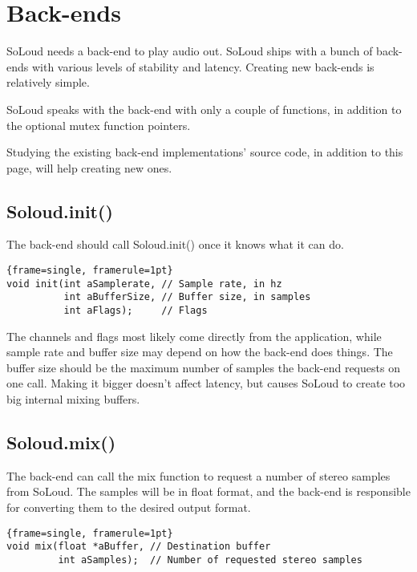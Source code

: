 
\chapter{Back-ends}

SoLoud needs a back-end to play audio out. SoLoud ships with a bunch of back-ends with various levels of stability and latency. Creating new back-ends is relatively simple.

SoLoud speaks with the back-end with only a couple of functions, in addition to the optional mutex function pointers.

Studying the existing back-end implementations' source code, in addition to this page, will help creating new ones.

\section{Soloud.init()}

The back-end should call Soloud.init() once it knows what it can do.

\begin{lstlisting}{frame=single, framerule=1pt}
void init(int aSamplerate, // Sample rate, in hz
          int aBufferSize, // Buffer size, in samples
          int aFlags);     // Flags
\end{lstlisting}

The channels and flags most likely come directly from the application, while sample rate and buffer size may depend on how the back-end does things. The buffer size should be the maximum number of samples the back-end requests on one call. Making it bigger doesn't affect latency, but causes SoLoud to create too big internal mixing buffers.

\section{Soloud.mix()}

The back-end can call the mix function to request a number of stereo samples from SoLoud. The samples will be in float format, and the back-end is responsible for converting them to the desired output format.

\begin{lstlisting}{frame=single, framerule=1pt}
void mix(float *aBuffer, // Destination buffer
         int aSamples);  // Number of requested stereo samples
\end{lstlisting}

